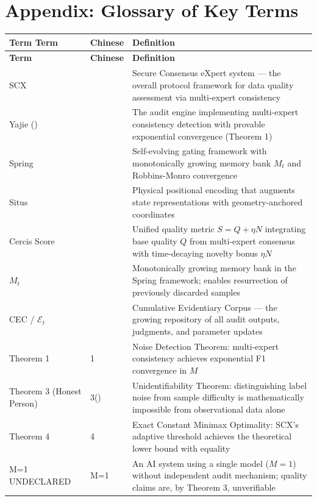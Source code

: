 \documentclass[12pt,a4paper]{article}
\theoremstyle{remark}
\begin{document}
{\section{Appendix: Glossary of Key Terms}
\begin{longtable}{@{}p{4cm} p{4cm} p{6cm}@{}}
\toprule
\textbf{Term Term} & \textbf{Chinese } & \textbf{Definition } \\
\midrule
\endfirsthead
\midrule
\textbf{Term} & \textbf{Chinese} & \textbf{Definition} \\
\midrule
\endhead
\bottomrule
\endfoot
SCX & & Secure Consensus eXpert system --- the overall protocol framework for data quality assessment via multi-expert consistency \\
\addlinespace
Yajie () & & The audit engine implementing multi-expert consistency detection with provable exponential convergence (Theorem 1) \\
\addlinespace
Spring & & Self-evolving gating framework with monotonically growing memory bank $M_t$ and Robbins-Monro convergence \\
\addlinespace
Situs & & Physical positional encoding that augments state representations with geometry-anchored coordinates \\
\addlinespace
Cercis Score & & Unified quality metric $S = Q + \eta N$ integrating base quality $Q$ from multi-expert consensus with time-decaying novelty bonus $\eta N$ \\
\addlinespace
$M_t$ & & Monotonically growing memory bank in the Spring framework; enables resurrection of previously discarded samples \\
\addlinespace
CEC / $\mathcal{E}_t$ & & Cumulative Evidentiary Corpus --- the growing repository of all audit outputs, judgments, and parameter updates \\
\addlinespace
Theorem 1 & 1 & Noise Detection Theorem: multi-expert consistency achieves exponential F1 convergence in $M$ \\
\addlinespace
Theorem 3 (Honest Person) & 3() & Unidentifiability Theorem: distinguishing label noise from sample difficulty is mathematically impossible from observational data alone \\
\addlinespace
Theorem 4 & 4 & Exact Constant Minimax Optimality: SCX's adaptive threshold achieves the theoretical lower bound with equality \\
\addlinespace
M=1 UNDECLARED & M=1 & An AI system using a single model ($M=1$) without independent audit mechanism; quality claims are, by Theorem 3, unverifiable \\

\end{longtable}}
\end{document}
